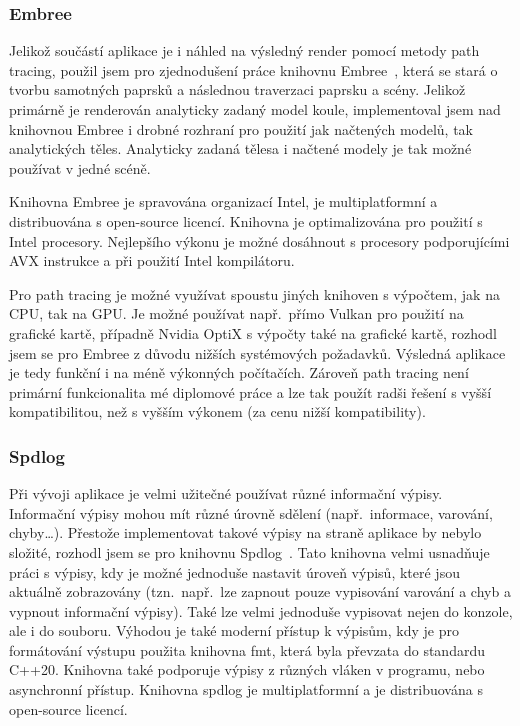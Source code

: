 \documentclass[czech,master]{diploma}
\begin{document}
\subsubsection*{Embree}
Jelikož součástí aplikace je i náhled na výsledný render pomocí metody path tracing, použil jsem pro zjednodušení práce knihovnu Embree~\cite{sourceEmbree}, která se stará o tvorbu samotných paprsků a následnou traverzaci paprsku a scény. Jelikož primárně je renderován analyticky zadaný model koule, implementoval jsem nad knihovnou Embree i drobné rozhraní pro použití jak načtených modelů, tak analytických těles. Analyticky zadaná tělesa i načtené modely je tak možné používat v jedné scéně.\par
Knihovna Embree je spravována organizací Intel, je multiplatformní a distribuována s open-source licencí. Knihovna je optimalizována pro použití s Intel procesory. Nejlepšího výkonu je možné dosáhnout s procesory podporujícími AVX instrukce a při použití Intel kompilátoru.\par
Pro path tracing je možné využívat spoustu jiných knihoven s výpočtem, jak na CPU, tak na GPU\@. Je možné používat např.\ přímo Vulkan pro použití na grafické kartě, případně Nvidia OptiX s výpočty také na grafické kartě, rozhodl jsem se pro Embree z důvodu nižších systémových požadavků. Výsledná aplikace je tedy funkční i na méně výkonných počítačích. Zároveň path tracing není primární funkcionalita mé diplomové práce a lze tak použít radši řešení s vyšší kompatibilitou, než s vyšším výkonem (za cenu nižší kompatibility).

\subsubsection*{Spdlog}
Při vývoji aplikace je velmi užitečné používat různé informační výpisy. Informační výpisy mohou mít různé úrovně sdělení (např.\ informace, varování, chyby\dots). Přestože implementovat takové výpisy na straně aplikace by nebylo složité, rozhodl jsem se pro knihovnu Spdlog~\cite{sourceSpdlog}. Tato knihovna velmi usnadňuje práci s výpisy, kdy je možné jednoduše nastavit úroveň výpisů, které jsou aktuálně zobrazovány (tzn.\ např.\ lze zapnout pouze vypisování varování a chyb a vypnout informační výpisy). Také lze velmi jednoduše vypisovat nejen do konzole, ale i do souboru. Výhodou je také moderní přístup k výpisům, kdy je pro formátování výstupu použita knihovna fmt, která byla převzata do standardu C++20. Knihovna také podporuje výpisy z různých vláken v programu, nebo asynchronní přístup. Knihovna spdlog je multiplatformní a je distribuována s open-source licencí.
\end{document}
